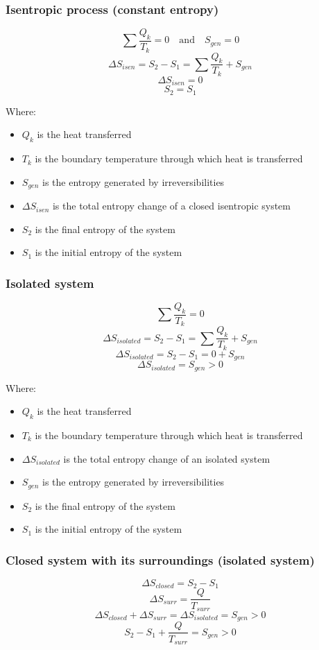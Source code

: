 \documentclass[11pt]{article}
\begin{document}
\subsubsection{Isentropic process (constant entropy)}
\label{sec:org1a2e3b1}
\[\sum \frac{Q_k}{T_k} = 0 \quad \text{and} \quad S_{gen} = 0\]
\[\Delta S_{isen} = S_2 - S_1 = \sum \frac{Q_k}{T_k} + S_{gen}\]
\[\Delta S_{isen} = 0\]
\[S_2 = S_1\]

Where:
\begin{itemize}
\item \(Q_k\) is the heat transferred
\item \(T_k\) is the boundary temperature through which heat is transferred
\item \(S_{gen}\) is the entropy generated by irreversibilities
\item \(\Delta S_{isen}\) is the total entropy change of a closed isentropic system
\item \(S_2\) is the final entropy of the system
\item \(S_1\) is the initial entropy of the system
\end{itemize}
\subsubsection{Isolated system}
\label{sec:orgdcf9d6c}
\[\sum \frac{Q_k}{T_k} = 0\]
\[\Delta S_{isolated} = S_2 - S_1 = \sum \frac{Q_k}{T_k} + S_{gen}\]
\[\Delta S_{isolated} = S_2 - S_1 = 0 + S_{gen}\]
\[\Delta S_{isolated} = S_{gen} > 0\]

Where:
\begin{itemize}
\item \(Q_k\) is the heat transferred
\item \(T_k\) is the boundary temperature through which heat is transferred
\item \(\Delta S_{isolated}\) is the total entropy change of an isolated system
\item \(S_{gen}\) is the entropy generated by irreversibilities
\item \(S_2\) is the final entropy of the system
\item \(S_1\) is the initial entropy of the system
\end{itemize}
\subsubsection{Closed system with its surroundings (isolated system)}
\label{sec:org506c0d2}
\[\Delta S_{closed} = S_2 - S_1\]
\[\Delta S_{surr} = \frac{Q}{T_{surr}}\]
\[\Delta S_{closed} + \Delta S_{surr} = \Delta S_{isolated} = S_{gen} > 0\]
\[S_2 - S_1 + \frac{Q}{T_{surr}} = S_{gen} > 0\]
\end{document}
